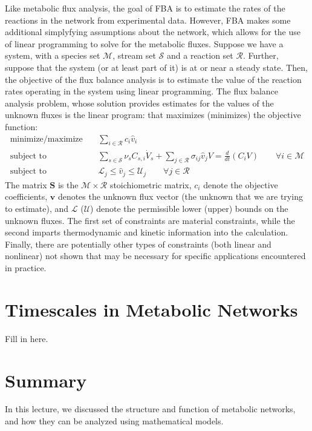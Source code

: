 \documentclass{article}[12pt]
\begin{document}
Like metabolic flux analysis, the goal of FBA is to estimate the rates of the reactions in the network from experimental data.
However, FBA makes some additional simplyfying assumptions about the network, which allows for the use of linear programming to solve for the metabolic fluxes.
Suppose we have a system, with a species set $\mathcal{M}$, stream set $\mathcal{S}$ and a reaction set $\mathcal{R}$. 
Further, suppose that the system (or at least part of it) is at or near a steady state. 
Then, the objective of the flux balance analysis is to estimate the value of the reaction rates operating in the system using linear programming.
The flux balance analysis problem, whose solution provides estimates for the values of the unknown fluxes is the linear program: 
that maximizes (minimizes) the objective function:
\begin{eqnarray}
\text{minimize/maximize}~& & \sum_{i\in\mathcal{R}}c_{i}\hat{v}_{i}\\
\text{subject to} & & \sum_{s\in\mathcal{S}}\nu_{s}C_{s,i}\dot{V}_{s} + \sum_{j\in\mathcal{R}}\sigma_{ij}\hat{v}_{j}V = \frac{d}{dt}\left(C_{i}V\right)\qquad\forall{i\in\mathcal{M}}\\
\text{subject to} & & \mathcal{L}_{j}\leq\hat{v}_{j}\leq\mathcal{U}_{j}\qquad\forall{j\in\mathcal{R}}
\end{eqnarray}
The matrix $\mathbf{S}$ is the $\mathcal{M}\times\mathcal{R}$ stoichiometric matrix, $c_{i}$ denote the objective coefficients, 
$\mathbf{v}$ denotes the unknown flux vector (the unknown that we are trying to estimate), and 
$\mathcal{L}$ ($\mathcal{U}$) denote the permissible lower (upper) bounds on the unknown fluxes. 
The first set of constraints are material constraints, 
while the second imparts thermodynamic and kinetic information into the calculation. 
Finally, there are potentially other types of constraints (both linear and nonlinear) not shown 
that may be necessary for specific applications encountered in practice.

\section{Timescales in Metabolic Networks}
Fill in here.

\section{Summary}
In this lecture, we discussed the structure and function of metabolic networks, and how they can be analyzed using mathematical models.






\end{document}
